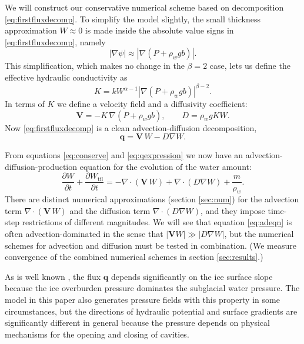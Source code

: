 \documentclass[gmd]{copernicus}   %
\newcommand{\text}{\textrm}
\newcommand\bV{\mathbf{V}}
\newcommand\bq{\mathbf{q}}
\newcommand{\Div}{\nabla\cdot}
\newcommand{\grad}{\nabla}
\newcommand{\Wtil}{W_{\text{til}}}
\begin{document}
We will construct our conservative numerical scheme based on decomposition \eqref{eq:firstfluxdecomp}.  To simplify the model slightly, the small thickness approximation $W\approx 0$ is made inside the absolute value signs in \eqref{eq:firstfluxdecomp}, namely
\begin{equation}
\left|\grad \psi\right| \approx \left|\grad \left(P + \rho_w g b \right)\right|.  \label{eq:Wsmall}
\end{equation}
This simplification, which makes no change in the $\beta=2$ case, lets us define the effective hydraulic conductivity as
\begin{equation}
K = k W^{\alpha-1} \left|\grad(P+\rho_w g b)\right|^{\beta - 2}. \label{eq:Kdefine}
\end{equation}
In terms of $K$ we define a velocity field and a diffusivity coefficient:
\begin{equation} \label{eq:vexpression}
  \bV = - K\, \grad \left(P + \rho_w g b\right), \qquad D = \rho_w g K W.
\end{equation}
Now \eqref{eq:firstfluxdecomp} is a clean advection-diffusion decomposition,
\begin{equation} \label{eq:qexpression}
  \bq = \bV\, W - D \grad W.
\end{equation}

From equations \eqref{eq:conserve} and \eqref{eq:qexpression} we now have an advection-diffusion-production equation for the evolution of the water amount:
\begin{equation} \label{eq:adeqn}
  \frac{\partial W}{\partial t} + \frac{\partial \Wtil}{\partial t} = - \Div\left(\bV\, W\right) + \Div \left(D \grad W\right) + \frac{m}{\rho_w}.
\end{equation}
There are distinct numerical approximations (section \ref{sec:num}) for the advection term $\Div\left(\bV\, W\right)$ and the diffusion term $\Div \left(D \grad W\right)$, and they impose time-step restrictions of different magnitudes.  We will see that equation \eqref{eq:adeqn} is often advection-dominated in the sense that $|\bV W| \gg |D \grad W|$, but the numerical schemes for advection and diffusion must be tested in combination.  (We measure convergence of the combined numerical schemes in section \ref{sec:results}.)

As is well known \citep{Clarke05}, the flux $\bq$ depends significantly on the ice surface slope because the ice overburden pressure dominates the subglacial water pressure.  The model in this paper also generates pressure fields with this property in some circumstances, but the directions of hydraulic potential and surface gradients are significantly different in general because the pressure depends on physical mechanisms for the opening and closing of cavities.
\end{document}

